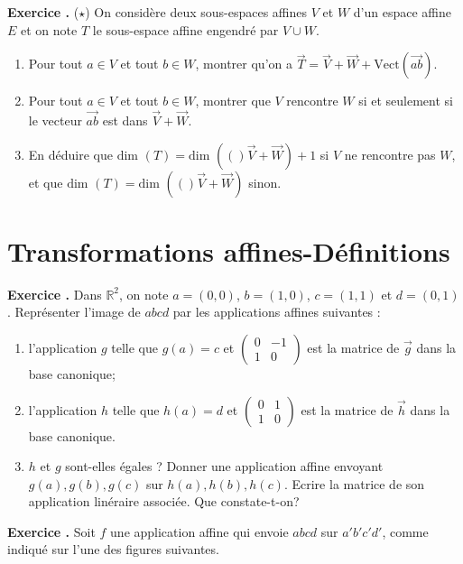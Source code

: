 \documentclass[10pt,a4paper]{article}
\def\bf#1{\textbf{#1}}
\newcounter{nexo}
\newcommand{\exo}{\medskip\noindent \bf{ Exercice \thenexo. \stepcounter{nexo}}}
\def\dim#1{\text{dim }(#1)}
\def\R{\mathbb{R}}
\def\mat#1{\begin{pmatrix}#1\end{pmatrix}}
\begin{document}
\medskip

\exo ($\star$)
 On consid\`ere deux sous-espaces affines $V$ et $W$ d'un espace affine $E$ et on note $T$ le sous-espace affine
   engendr\'e par $V\cup W$.
   \begin{enumerate}
    \item Pour tout $a\in V$ et tout $b\in W$, montrer qu'on a $\overrightarrow{T}=\overrightarrow{V}+\overrightarrow{W}+\mathrm{Vect}(\overrightarrow{ab})$.
    \item Pour tout $a\in V$ et tout $b\in W$, montrer que $V$ rencontre $W$ si et seulement si le vecteur $\overrightarrow{ab}$ est dans
    $\overrightarrow{V}+\overrightarrow{W}$.
    \item En d\'eduire que $\dim T=\dim(\overrightarrow{V} + \overrightarrow{W})+1$ si $V$ ne rencontre pas $W$, et que $\dim T=\dim(\overrightarrow{V}+\overrightarrow{W})$ sinon.
   \end{enumerate}
   
   
 \section{Transformations affines-D\'efinitions}
 
\exo
Dans $\R^{2}$, on note $a=(0,0)$, $b=(1,0)$, $c=(1,1)$ et $d=(0,1)$. Repr\'esenter l'image de $abcd$ par les applications affines suivantes : 
\begin{enumerate}
\item l'application $g$ telle que $g(a)=c$ et 
$\mat{0&-1\\1&0}$  est la matrice de $\overrightarrow{g}$ dans la base canonique;
  \item l'application $h$ telle que $h(a)=d$ et 
$\mat{0&1\\1&0}$ est la matrice de $\overrightarrow{h}$ dans la base canonique.  
\item $h$ et $g$ sont-elles \'egales ? Donner une application affine envoyant $g(a), g(b), g(c)$ sur $h(a), h(b), h(c)$. Ecrire la matrice de son application lin\'eraire associ\'ee. Que constate-t-on?
\end{enumerate}

\medskip

\exo
Soit $f$ une application affine qui envoie $abcd$ sur $a'b'c'd'$, comme indiqu\'e sur l'une des figures suivantes.
\end{document}
